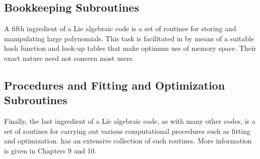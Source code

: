 \subsection{Bookkeeping Subroutines}

     A fifth ingredient of a Lie algebraic code is a set of
routines for storing and manipulating large polynomials.  This task is
facilitated in \Mary by means of a suitable hash function and look-up
tables that make optimum use of memory space.
Their exact nature need not concern most \Mary users.

\subsection{Procedures and Fitting and Optimization Subroutines}

     Finally, the last ingredient of a Lie algebraic code, as with many
other codes, is a set of routines for carrying out various computational
procedures such as fitting and optimization.   \Mary has an extensive
collection of such routines.  More information is given in Chapters 9 and
10.

